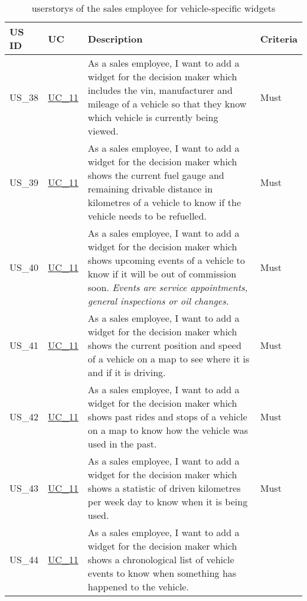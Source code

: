   \sffamily
  \begin{footnotesize}
    \label{FahrzeugWidgets}
    \begin{longtable}[L L L]{ p{} p{} p{} p{} }
      \caption                       %
          {\Glspl{userstory} of the sales employee for vehicle-specific \glspl{widget}} %
          \\
      \toprule
      \textbf{US ID} & \textbf{UC} & \textbf{Description} & \textbf{Criteria} \\
      \midrule
      \hypertarget{Ref:US38}{US\_38} & \hyperlink{Ref:UC11}{UC\_11} & As a sales employee, I want to add a \gls{widget} for the decision maker which includes the \gls{vin}, manufacturer and mileage of a vehicle so that they know which vehicle is currently being viewed. & Must \\
      \hypertarget{Ref:US39}{US\_39} & \hyperlink{Ref:UC11}{UC\_11} & As a sales employee, I want to add a \gls{widget} for the decision maker which shows the current fuel gauge and remaining drivable distance in kilometres of a vehicle to know if the vehicle needs to be refuelled. & Must \\
      \hypertarget{Ref:US40}{US\_40} & \hyperlink{Ref:UC11}{UC\_11} & As a sales employee, I want to add a \gls{widget} for the decision maker which shows upcoming events of a vehicle to know if it will be out of commission soon.
      \newline
      \emph{Events are service appointments, general inspections or oil changes.} & Must \\
      \hypertarget{Ref:US41}{US\_41} & \hyperlink{Ref:UC11}{UC\_11} & As a sales employee, I want to add a \gls{widget} for the decision maker which shows the current position and speed of a vehicle on a map to see where it is and if it is driving. & Must \\
      \hypertarget{Ref:US42}{US\_42} & \hyperlink{Ref:UC11}{UC\_11} & As a sales employee, I want to add a \gls{widget} for the decision maker which shows past rides and stops of a vehicle on a map to know how the vehicle was used in the past. & Must \\
      \hypertarget{Ref:US43}{US\_43} & \hyperlink{Ref:UC11}{UC\_11} & As a sales employee, I want to add a \gls{widget} for the decision maker which shows a statistic of driven kilometres per week day to know when it is being used. & Must \\
      \hypertarget{Ref:US44}{US\_44} & \hyperlink{Ref:UC11}{UC\_11} & As a sales employee, I want to add a \gls{widget} for the decision maker which shows a chronological list of vehicle events to know when something has happened to the vehicle. 

\end{longtable}
\end{footnotesize}
